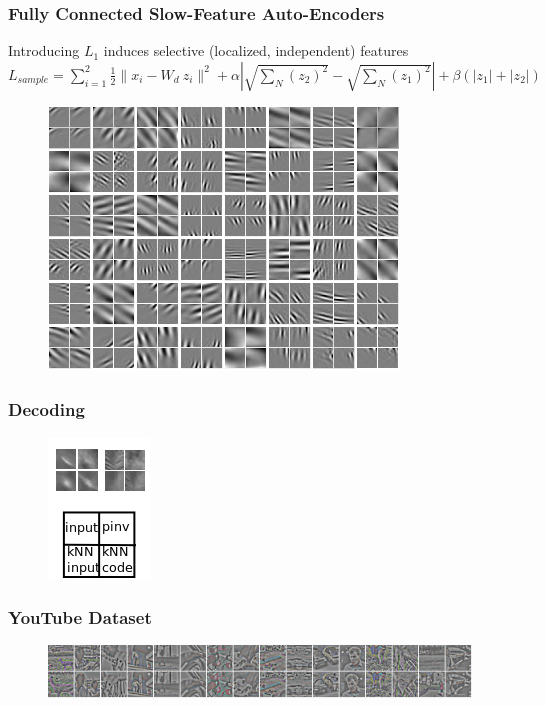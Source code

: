 \documentclass{beamer}
\begin{document}
\begin{frame}
\frametitle{Fully Connected Slow-Feature Auto-Encoders} 
Introducing $L_1$ induces selective (localized, independent) features \\ \vspace{0.2cm} 
\small
$L_{sample} = \sum_{i=1} ^2 \frac{1}{2}\|x_i - W_d~z_i\|^2 +\alpha|\sqrt{\sum_N (z_2)^2} - \sqrt{\sum_N (z_1)^2}| + \beta(|z_1|+|z_2|)$\\
\begin{figure}
\center 
\includegraphics[scale=0.4]{./figures/L1_pool_SF.png} \hspace{0.5cm} 
\end{figure} 
\end{frame} 

\begin{frame} 
\frametitle{Decoding} 
\begin{figure} 
\includegraphics[scale=1]{./figures/example.png}
\end{figure} 
\end{frame} 

\begin{frame} 
\frametitle{YouTube Dataset} 
\begin{figure} 
\includegraphics[scale=0.6]{./figures/sample.png}
\end{figure} 
\end{frame} 
\end{document}
